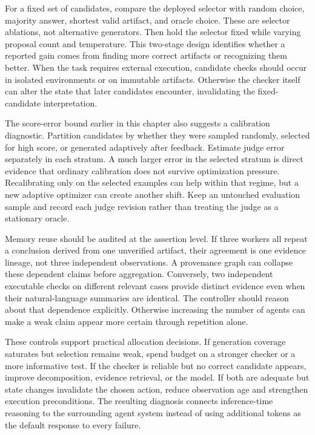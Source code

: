 For a fixed set of candidates, compare the deployed selector with random choice, majority answer, shortest valid artifact, and oracle choice. These are selector ablations, not alternative generators. Then hold the selector fixed while varying proposal count and temperature. This two-stage design identifies whether a reported gain comes from finding more correct artifacts or recognizing them better. When the task requires external execution, candidate checks should occur in isolated environments or on immutable artifacts. Otherwise the checker itself can alter the state that later candidates encounter, invalidating the fixed-candidate interpretation.

The score-error bound earlier in this chapter also suggests a calibration diagnostic. Partition candidates by whether they were sampled randomly, selected for high score, or generated adaptively after feedback. Estimate judge error separately in each stratum. A much larger error in the selected stratum is direct evidence that ordinary calibration does not survive optimization pressure. Recalibrating only on the selected examples can help within that regime, but a new adaptive optimizer can create another shift. Keep an untouched evaluation sample and record each judge revision rather than treating the judge as a stationary oracle.

Memory reuse should be audited at the assertion level. If three workers all repeat a conclusion derived from one unverified artifact, their agreement is one evidence lineage, not three independent observations. A provenance graph can collapse these dependent claims before aggregation. Conversely, two independent executable checks on different relevant cases provide distinct evidence even when their natural-language summaries are identical. The controller should reason about that dependence explicitly. Otherwise increasing the number of agents can make a weak claim appear more certain through repetition alone.

These controls support practical allocation decisions. If generation coverage saturates but selection remains weak, spend budget on a stronger checker or a more informative test. If the checker is reliable but no correct candidate appears, improve decomposition, evidence retrieval, or the model. If both are adequate but state changes invalidate the chosen action, reduce observation age and strengthen execution preconditions. The resulting diagnosis connects inference-time reasoning to the surrounding agent system instead of using additional tokens as the default response to every failure.
